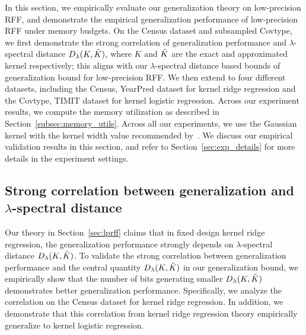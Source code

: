 In this section, we empirically evaluate our generalization theory on low-precision RFF, and demonstrate the empirical generalization performance of low-precision RFF under memory budgets. On the Census dataset and subsampled Covtype, we first demonstrate the strong correlation of generalization performance and $\lambda$-spectral distance $D_{\lambda}(K,\tilde{K})$, where $K$ and $\tilde{K}$ are the exact and approximated kernel respectively; this aligns with our $\lambda$-spectral distance based bounds of generalization bound for low-precision RFF. We then extend to four different datasets, including the Census, YearPred dataset for kernel ridge regression and the Covtype, TIMIT dataset for kernel logistic regression. Across our experiment results, we compute the memory utilization as described in Section~\ref{subsec:memory_utils}. Across all our experiments, we use the Gaussian kernel with the kernel width value recommended by~\citet{may2017kernel}. We discuss our empirical validation results in this section, and refer to Section~\ref{sec:exp_details} for more details in the experiment settings.

\subsection{Strong correlation between generalization and $\lambda$-spectral distance}
Our theory in Section~\ref{sec:lprff} claims that in fixed design kernel ridge regression, the generalization performance strongly depends on $\lambda$-spectral distance $D_{\lambda}(K,\tilde{K})$.
To validate the strong correlation between generalization performance and the central quantity $D_{\lambda}(K,\tilde{K})$ in our generalization bound, we empirically show that the number of bits generating smaller $D_{\lambda}(K,\tilde{K})$ demonstrates better generalization performance. 
Specifically, we analyze the correlation on the Census dataset for kernel ridge regression. In addition, we demonstrate that this correlation from kernel ridge regression theory empirically generalize to kernel logistic regression. 

